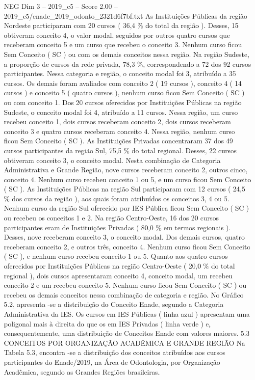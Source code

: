 \begin{textsample}{NEG Dim 3 – 2019\_c5 – Score 2.00 – 2019\_c5/enade\_2019\_odonto\_2321d6f7bf.txt}
As Instituições Públicas da região Nordeste participaram com 20 cursos ( 36,4 \% do total da região ).
Desses, 15 obtiveram conceito 4, o valor modal, seguidos por outros quatro cursos que receberam conceito 5 e um curso que recebeu o conceito 3.
Nenhum curso ficou Sem Conceito ( SC ) ou com os demais conceitos nessa região.
Na região Sudeste, a proporção de cursos da rede privada, 78,3 \%, correspondendo a 72 dos 92 cursos participantes.
Nessa categoria e região, o conceito modal foi 3, atribuído a 35 cursos.
Os demais foram avaliados com conceito 2 ( 19 cursos ), conceito 4 ( 14 cursos ) e conceito 5 ( quatro cursos ), nenhum curso ficou Sem Conceito ( SC ) ou com conceito 1.
Dos 20 cursos oferecidos por Instituições Públicas na região Sudeste, o conceito modal foi 4, atribuído a 11 cursos.
Nessa região, um curso recebeu conceito 1, dois cursos receberam conceito 2, dois cursos receberam conceito 3 e quatro cursos receberam conceito 4.
Nessa região, nenhum curso ficou Sem Conceito ( SC ).
As Instituições Privadas concentraram 37 dos 49 cursos participantes da região Sul, 75,5 \% do total regional.
Desses, 22 cursos obtiveram conceito 3, o conceito modal.
Nesta combinação de Categoria Administrativa e Grande Região, nove cursos receberam conceito 2, outros cinco, conceito 4.
Nenhum curso recebeu conceito 1 ou 5, e um curso ficou Sem Conceito ( SC ).
As Instituições Públicas na região Sul participaram com 12 cursos ( 24,5 \% dos cursos da região ), aos quais foram atribuídos os conceitos 3, 4 ou 5.
Nenhum curso da região Sul oferecido por IES Pública ficou Sem Conceito ( SC ) ou recebeu os conceitos 1 e 2.
Na região Centro-Oeste, 16 dos 20 cursos participantes eram de Instituições Privadas ( 80,0 \% em termos regionais ).
Desses, nove receberam conceito 3, o conceito modal.
Dos demais cursos, quatro receberam conceito 2, e outros três, conceito 4.
Nenhum curso ficou Sem Conceito ( SC ), e nenhum curso recebeu conceito 1 ou 5.
Quanto aos quatro cursos oferecidos por Instituições Públicas na região Centro-Oeste ( 20,0 \% do total regional ), dois cursos apresentaram conceito 4, conceito modal, um recebeu conceito 2 e um recebeu conceito 5.
Nenhum curso ficou Sem Conceito ( SC ) ou recebeu os demais conceitos nessa combinação de categoria e região.
No Gráfico 5.2, apresenta -se a distribuição do Conceito Enade, segundo a Categoria Administrativa da IES.
Os cursos em IES Públicas ( linha azul ) apresentam uma poligonal mais à direita do que os em IES Privadas ( linha verde ) e, consequentemente, uma distribuição de Conceitos Enade com valores maiores. 5.3 CONCEITOS POR ORGANIZAÇÃO ACADÊMICA E GRANDE REGIÃO Na Tabela 5.3, encontra -se a distribuição dos conceitos atribuídos aos cursos participantes do Enade/2019, na Área de Odontologia, por Organização Acadêmica, segundo as Grandes Regiões brasileiras.

\end{textsample}
